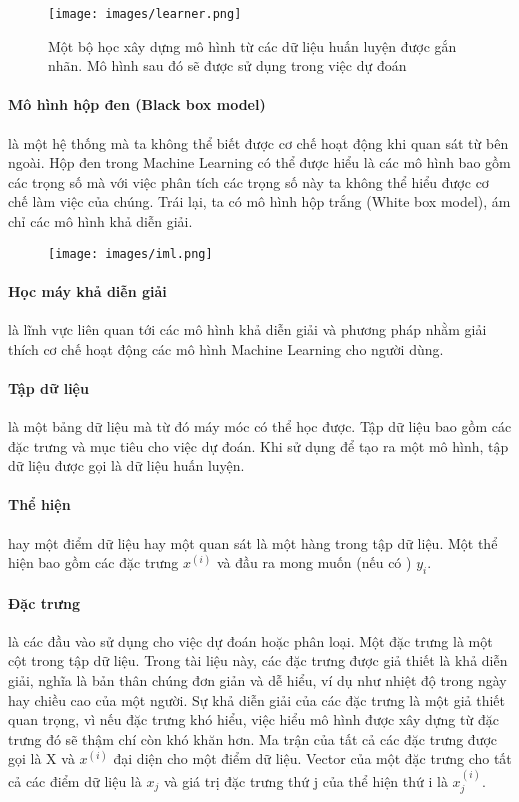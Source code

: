 \begin{figure*}[h!]
	\centering
	\texttt{[image: images/learner.png]}
	\caption{Một bộ học xây dựng mô hình từ các dữ liệu huấn luyện được gắn nhãn. Mô hình sau đó sẽ được sử dụng trong việc dự đoán}
\end{figure*}

\paragraph{Mô hình hộp đen (Black box model)} là một hệ thống mà ta không thể biết được cơ chế hoạt động khi quan sát từ bên ngoài. Hộp đen trong Machine Learning có thể được hiểu là các mô hình bao gồm các trọng số mà với việc phân tích các trọng số này ta không thể hiểu được cơ chế làm việc của chúng. Trái lại, ta có mô hình hộp trắng (White box model), ám chỉ các mô hình khả diễn giải.  

\begin{figure*}[h!]
	\centering
	\texttt{[image: images/iml.png]}
\end{figure*}

\paragraph{Học máy khả diễn giải} là lĩnh vực liên quan tới các mô hình khả diễn giải và phương pháp nhằm giải thích cơ chế hoạt động các mô hình Machine Learning cho người dùng.

\paragraph{Tập dữ liệu} là một bảng dữ liệu mà từ đó máy móc có thể học được. Tập dữ liệu bao gồm các đặc trưng và mục tiêu cho việc dự đoán. Khi sử dụng để tạo ra một mô hình, tập dữ liệu được gọi là dữ liệu huấn luyện.

\paragraph{Thể hiện} hay một điểm dữ liệu hay một quan sát là một hàng trong tập dữ liệu. Một thể hiện bao gồm các đặc trưng $x^{(i)}$ và đầu ra mong muốn (nếu có
) $y_i$.

\paragraph{Đặc trưng} là các đầu vào sử dụng cho việc dự đoán hoặc phân loại. Một đặc trưng là một cột trong tập dữ liệu. Trong tài liệu này, các đặc trưng được giả thiết là khả diễn giải, nghĩa là bản thân chúng đơn giản và dễ hiểu, ví dụ như nhiệt độ trong ngày hay chiều cao của một người. Sự khả diễn giải của các đặc trưng là một giả thiết quan trọng, vì nếu đặc trưng khó hiểu, việc hiểu mô hình được xây dựng từ đặc trưng đó sẽ thậm chí còn khó khăn hơn. Ma trận của tất cả các đặc trưng được gọi là X và $x^{(i)}$ đại diện cho một điểm dữ liệu. Vector của một đặc trưng cho tất cả các điểm dữ liệu là $x_j$ và giá trị đặc trưng thứ j của thể hiện thứ i là $x^{(i)}_j$.

